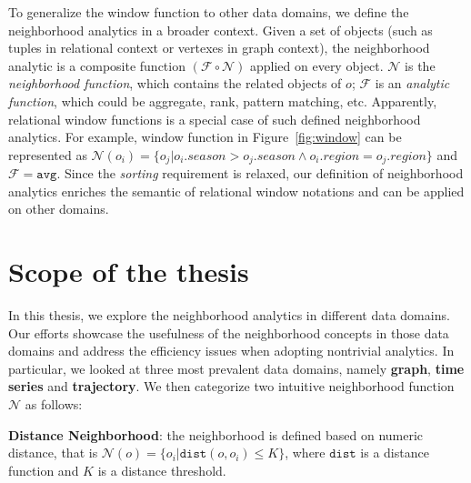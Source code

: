 To generalize the window function to other data domains, we define the neighborhood
analytics in a broader context. Given a set of objects 
(such as tuples in relational context or vertexes in graph context),
the neighborhood analytic is a composite function
$(\mathcal{F} \circ \mathcal{N})$ applied on every object. $\mathcal{N}$
is the \emph{neighborhood function}, which contains the related objects of $o$;
$\mathcal{F}$ is an \emph{analytic function}, which could be aggregate, rank,
pattern matching, etc.
Apparently, relational window functions is a special case of such defined 
neighborhood analytics. For example, window function in Figure~\ref{fig:window} 
can be represented as $\mathcal{N}(o_i)=\{o_j | o_i.season > o_j.season \wedge o_i.region = o_j.region\}$
and $\mathcal{F} = \mathtt{avg}$.
Since the \emph{sorting} requirement is relaxed, our definition of neighborhood analytics
enriches the semantic of relational window notations 
and can be applied on other domains.
%
%
%


\section{Scope of the thesis}
In this thesis, we explore the neighborhood analytics in
different data domains. Our efforts showcase the usefulness of the neighborhood
concepts in those data domains and address the efficiency issues when adopting
nontrivial analytics. In particular, we looked at three most prevalent data domains, namely \textbf{graph},
\textbf{time series} and \textbf{trajectory}. 
We then categorize two intuitive neighborhood function $\mathcal{N}$ as follows:

\textbf{Distance Neighborhood}: the neighborhood is defined based on numeric distance, that is $\mathcal{N}(o) = \{o_i | \mathtt{dist}(o,o_i) \leq K \}$, where $\mathtt{dist}$ is a distance function and $K$ is a distance threshold.


